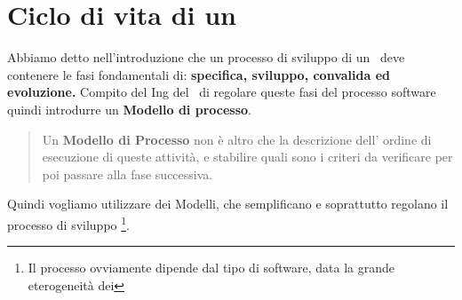 \section{Ciclo di vita di un \Sw}
Abbiamo detto nell'introduzione che un processo di sviluppo di un \sw\ deve contenere le fasi fondamentali di: \textbf{specifica, sviluppo, convalida ed evoluzione.}
Compito del Ing del \Sw\ di regolare queste fasi del processo software quindi introdurre
un \textbf{Modello di processo}.
\begin{quote}
    Un \textbf{Modello di Processo} non \`e altro che la descrizione dell' ordine di esecuzione di queste attivit\`a, e stabilire quali sono i criteri da verificare per poi passare alla fase successiva.
    \label{quote:modello_di_processo}
\end{quote}
Quindi vogliamo utilizzare dei Modelli, che semplificano e soprattutto regola\-no il processo di sviluppo \sw \footnote{Il processo ovviamente dipende dal tipo di software, data la grande eterogeneit\`a dei \sw}.
\\
